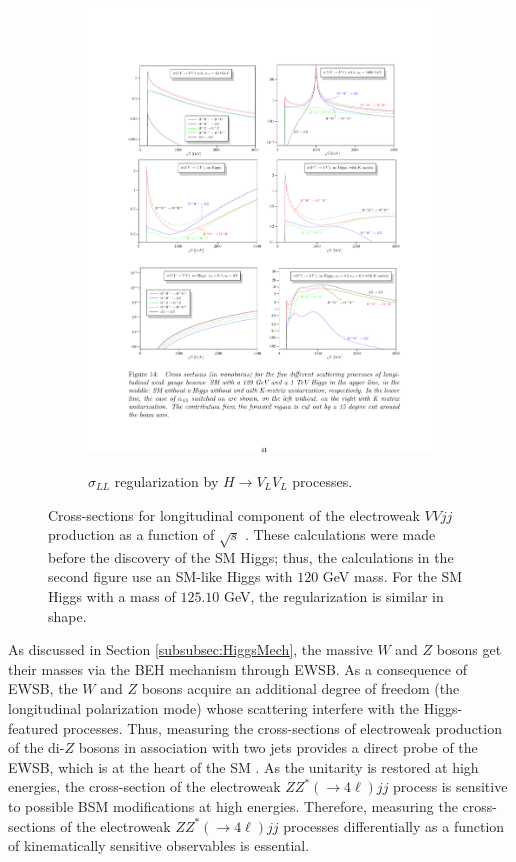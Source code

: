 \begin{figure}[!htbp]
\begin{subfigure}{.49\textwidth}
    \includegraphics[width=.99\linewidth]{figures/Theory/VBS_WithHiggs.pdf}  \\
    \caption{$\sigma_{LL}$ regularization by $H\rightarrow V_L V_L$ processes.}
    \label{fig:SM_XS}
  \end{subfigure}
  \caption{ Cross-sections for longitudinal component of the electroweak $VVjj$ production as a function of $\sqrt{s}$ \label{fig:SM_EWK_ZZjj_XS} \cite{VBSDiagrams}. These calculations were made before the discovery of the SM Higgs; thus, the calculations in the second figure use an SM-like Higgs with $120$ GeV mass. For the SM Higgs with a mass of $125.10$ GeV, the regularization is similar in shape. }
\end{figure}

As discussed in Section \ref{subsubsec:HiggsMech}, the massive $W$ and $Z$ bosons get their masses via the BEH mechanism through EWSB. As a consequence of EWSB, the $W$ and $Z$ bosons acquire an additional degree of freedom (the longitudinal polarization mode) whose scattering interfere with the Higgs-featured processes. Thus, measuring the cross-sections of electroweak production of the di-$Z$ bosons in association with two jets provides a direct probe of the EWSB, which is at the heart of the SM \cite{CMSRun2ZZjj}. As the unitarity is restored at high energies, the cross-section of the electroweak $ZZ^*(\rightarrow 4\ell) jj$ process is sensitive to possible BSM modifications at high energies. Therefore, measuring the cross-sections of the electroweak $ZZ^*(\rightarrow 4\ell) jj$ processes differentially as a function of kinematically sensitive observables is essential. 

